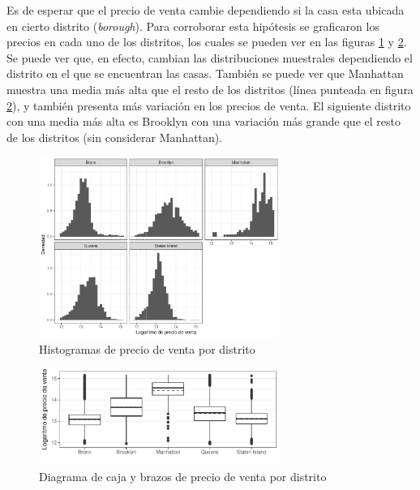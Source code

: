 Es de esperar que el precio de venta cambie dependiendo si la casa esta ubicada en cierto distrito (\textit{borough}). Para corroborar esta hipótesis se graficaron los precios en cada uno de los distritos, los cuales se pueden ver en las figuras \ref{fig:eda_histogram_price_borough} y \ref{fig:eda_boxplot_price_borough}. Se puede ver que, en efecto, cambian las distribuciones muestrales dependiendo el distrito en el que se encuentran las casas. También se puede ver que Manhattan muestra una media más alta que el resto de los distritos (línea punteada en figura \ref{fig:eda_boxplot_price_borough}), y también presenta más variación en los precios de venta. El siguiente distrito con una media más alta es Brooklyn con una variación más grande que el resto de los distritos (sin considerar Manhattan). 

\begin{figure}[H]
    \centering
    \includegraphics[width=0.7\textwidth]{images/eda_histogram_price_borough.pdf}
    \caption{Histogramas de precio de venta por distrito}
    \label{fig:eda_histogram_price_borough}
\end{figure}


\begin{figure}[H]
    \centering
    \includegraphics[width=0.7\textwidth]{images/eda_boxplot_price_borough.pdf}
    \caption{Diagrama de caja y brazos de precio de venta por distrito}
    \label{fig:eda_boxplot_price_borough}
\end{figure}

